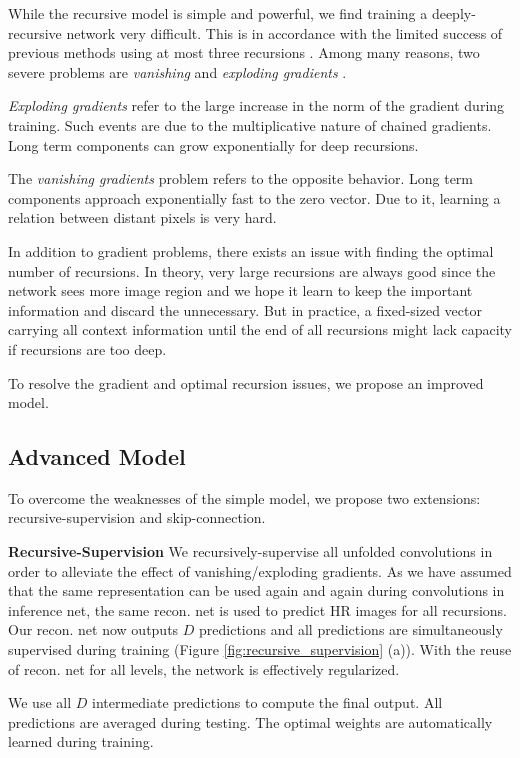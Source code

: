 \documentclass[10pt,twocolumn,letterpaper]{article}
\begin{document}
While the recursive model is simple and powerful, we find training a deeply-recursive network very difficult. This is in accordance with the limited success of previous methods using at most three recursions \cite{Liang_2015_CVPR}.  Among many reasons, two severe problems are \textit{vanishing} and \textit{exploding gradients} \cite{bengio1994learning, pascanu2013difficulty}.  

\textit{Exploding gradients} refer to the large increase in the norm
of the gradient during training. Such events are due to
the multiplicative nature of chained gradients. Long term components can grow exponentially for deep recursions.


The
\textit{vanishing gradients} problem refers to the opposite behavior. Long term components approach exponentially
fast to the zero vector. Due to it, learning a relation between distant pixels is very hard.

In addition to gradient problems, there exists an issue with finding the optimal number of recursions. In theory, very large recursions are always good since the network sees more image region and we hope it learn to keep the important information and discard the unnecessary.  But in practice, a fixed-sized vector carrying all context information until the end of all recursions might lack capacity if recursions are too deep. 

To resolve the gradient and optimal recursion issues, we propose an improved model.


\subsection{Advanced Model} 
To overcome the weaknesses of the simple model, we propose two extensions: recursive-supervision and skip-connection. 

\textbf{Recursive-Supervision} We recursively-supervise all unfolded convolutions in order to alleviate the effect of vanishing/exploding gradients. As we have assumed that the same representation can be used again and again during convolutions in inference net, the same recon. net is used to predict HR images for all recursions. Our recon. net now outputs $D$ predictions and all predictions are simultaneously supervised during training (Figure \ref{fig:recursive_supervision} (a)). With the reuse of recon. net for all levels, the network is effectively regularized.

We use all $D$ intermediate predictions to compute the final output. All predictions are averaged during testing. The optimal weights are automatically learned during training. 
\end{document}
